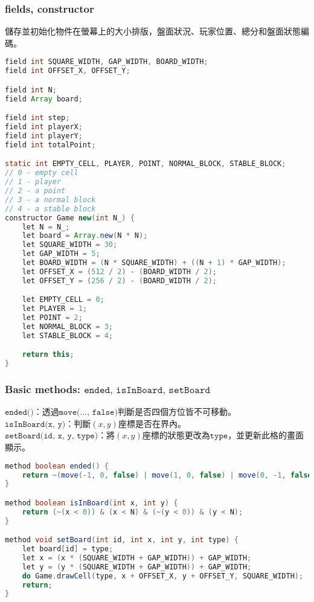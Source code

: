 \documentclass[pstricks, 12pt, a4paper]{article}
\begin{document}
    \subsubsection{fields, constructor}
      儲存並初始化物件在螢幕上的大小排版，盤面狀況、玩家位置、總分和盤面狀態編碼。
      \begin{lstlisting}[language=Java, frame=single]
field int SQUARE_WIDTH, GAP_WIDTH, BOARD_WIDTH;
field int OFFSET_X, OFFSET_Y;

field int N;
field Array board;

field int step;
field int playerX;
field int playerY;
field int totalPoint;

static int EMPTY_CELL, PLAYER, POINT, NORMAL_BLOCK, STABLE_BLOCK;
// 0 - empty cell
// 1 - player
// 2 - a point
// 3 - a normal block
// 4 - a stable block
constructor Game new(int N_) {
    let N = N_;
    let board = Array.new(N * N);
    let SQUARE_WIDTH = 30;
    let GAP_WIDTH = 5;
    let BOARD_WIDTH = (N * SQUARE_WIDTH) + ((N + 1) * GAP_WIDTH);
    let OFFSET_X = (512 / 2) - (BOARD_WIDTH / 2);
    let OFFSET_Y = (256 / 2) - (BOARD_WIDTH / 2);

    let EMPTY_CELL = 0;
    let PLAYER = 1;
    let POINT = 2;
    let NORMAL_BLOCK = 3;
    let STABLE_BLOCK = 4;

    return this;
}
      \end{lstlisting}
    \subsubsection{Basic methods: $\texttt{ended, isInBoard, setBoard}$}
      \noindent $\texttt{ended()}$：透過$\texttt{move(..., false)}$判斷是否四個方位皆不可移動。\\
      $\texttt{isInBoard(x, y)}$：判斷$(x, y)$座標是否在界內。\\
      $\texttt{setBoard(id, x, y, type)}$：將$(x, y)$座標的狀態更改為$\texttt{type}$，並更新此格的畫面顯示。
      \begin{lstlisting}[language=Java, frame=single]
method boolean ended() {
    return ~(move(-1, 0, false) | move(1, 0, false) | move(0, -1, false) | move(0, 1, false));
}

method boolean isInBoard(int x, int y) {
    return (~(x < 0)) & (x < N) & (~(y < 0)) & (y < N);
}

method void setBoard(int id, int x, int y, int type) {
    let board[id] = type;
    let x = (x * (SQUARE_WIDTH + GAP_WIDTH)) + GAP_WIDTH;
    let y = (y * (SQUARE_WIDTH + GAP_WIDTH)) + GAP_WIDTH;
    do Game.drawCell(type, x + OFFSET_X, y + OFFSET_Y, SQUARE_WIDTH);
    return;
}
      \end{lstlisting}
\end{document}
